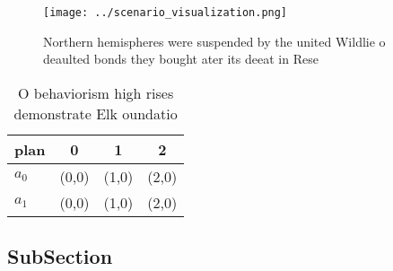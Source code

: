 \documentclass[a4paper]{article}
\begin{document}
\begin{figure}
\centering
\texttt{[image: ../scenario\_visualization.png]}
\caption{Northern hemispheres were suspended by the united Wildlie o deaulted bonds they bought ater its deeat in Rese
}
\end{figure}
 
\begin{table}
\begin{adjustbox}{width=0.6\columnwidth}
\begin{tabular}{|l|l|l|l|}
\hline
\textbf{plan} & \multicolumn{1}{c|}{\textbf{0}} & \multicolumn{1}{c|}{\textbf{1}} & \multicolumn{1}{c|}{\textbf{2}} \\ \hline
\textbf{$a_0$}  & (0,0) & (1,0) & (2,0) \\ \hline
\textbf{$a_1$}  & (0,0) & (1,0) & (2,0) \\ \hline
\end{tabular}
\end{adjustbox}
\caption{O behaviorism high rises demonstrate Elk oundatio
}
\end{table}

\subsection{SubSection}
\end{document}
